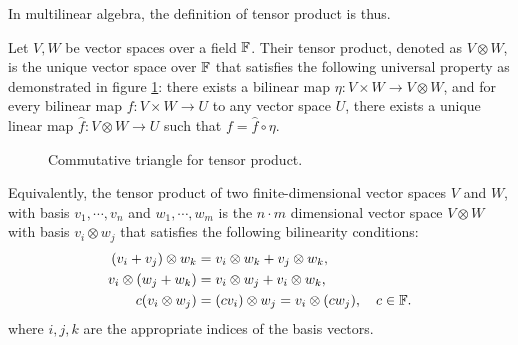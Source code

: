 In multilinear algebra, the definition of tensor product is thus. 

\begin{definition}
	Let $V, W$ be vector spaces over a field $\mathbb{F}$. Their tensor product, denoted as $V \otimes W$, is the unique vector space over $\mathbb{F}$ that satisfies the following universal property as demonstrated in figure \ref{fig:tensor-product-universal}:
	there exists a bilinear map $\eta: V\times W \rightarrow V \otimes W $, and for every bilinear map $f : V \times W \rightarrow U$ to any vector space $U$, there exists a unique linear map $\hat{f} : V \otimes W \rightarrow U$ such that $f = \hat{f} \circ \eta$. 
\end{definition}

\begin{figure}[ht]
	\centering 
    
	\caption{Commutative triangle for tensor product.}\label{fig:tensor-product-universal}
\end{figure}

Equivalently, the tensor product of two finite-dimensional vector spaces $V$ and $W$, with basis $v_1, \cdots, v_n$ and $w_1, \cdots, w_m$ is the $n\cdot m$ dimensional vector space $V \otimes W$ with basis $v_i \otimes w_j$ that satisfies the following bilinearity conditions:
\begin{equation*}
	\begin{aligned}
		(v_i + v_j) \otimes w_k &= v_i \otimes w_k + v_j \otimes w_k, \\
		v_i \otimes (w_j + w_k) &= v_i \otimes w_j + v_i \otimes w_k, \\
		c (v_i \otimes w_j) &= (c v_i) \otimes w_j = v_i \otimes (c w_j), \quad c \in \mathbb{F}.
	\end{aligned}
\end{equation*}
where $i, j, k$ are the appropriate indices of the basis vectors.

